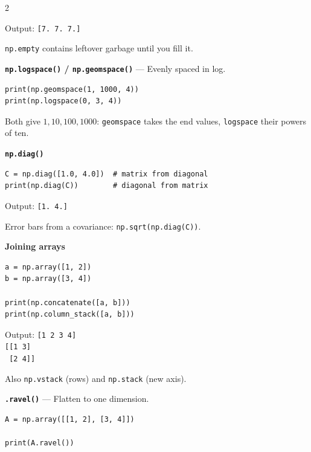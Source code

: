 \documentclass[10pt,a4paper]{article}
\begin{document}
\begin{multicols}{2}
\begin{card}
Output:
\texttt{[7. 7. 7.]}

\texttt{np.empty} contains leftover garbage until you fill it.
\end{card}

\begin{card}
\textbf{\texttt{np.logspace()} / \texttt{np.geomspace()}} --- Evenly spaced in log.

\begin{lstlisting}[style=pythonstyle]
print(np.geomspace(1, 1000, 4))
print(np.logspace(0, 3, 4))
\end{lstlisting}

Both give $1, 10, 100, 1000$: \texttt{geomspace} takes the end values,
\texttt{logspace} their powers of ten.
\end{card}

\begin{card}
\textbf{\texttt{np.diag()}}

\begin{lstlisting}[style=pythonstyle]
C = np.diag([1.0, 4.0])  # matrix from diagonal
print(np.diag(C))        # diagonal from matrix
\end{lstlisting}

Output:
\texttt{[1. 4.]}

Error bars from a covariance: \texttt{np.sqrt(np.diag(C))}.
\end{card}

\begin{card}
\textbf{Joining arrays}

\begin{lstlisting}[style=pythonstyle]
a = np.array([1, 2])
b = np.array([3, 4])

print(np.concatenate([a, b]))
print(np.column_stack([a, b]))
\end{lstlisting}

Output:
\texttt{[1 2 3 4]}\\
\texttt{[[1 3]}\\
\texttt{\ [2 4]]}

Also \texttt{np.vstack} (rows) and \texttt{np.stack} (new axis).
\end{card}

\begin{card}
\textbf{\texttt{.ravel()}} --- Flatten to one dimension.

\begin{lstlisting}[style=pythonstyle]
A = np.array([[1, 2], [3, 4]])

print(A.ravel())
\end{lstlisting}


\end{card}
\end{multicols}
\end{document}
